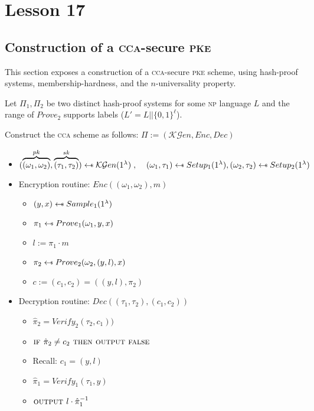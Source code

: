 \chapter*{Lesson 17}

\section{Construction of a \textsc{cca}-secure \textsc{pke}}

This section exposes a construction of a \textsc{cca}-secure \textsc{pke} scheme, using hash-proof systems, membership-hardness, and the $n$-universality property.

Let $\Pi_1, \Pi_2$ be two distinct hash-proof systems for some \textsc{np} language $L$ and the range of $Prove_2$ supports labels ($L'=L||\{0, 1\}^\ell$).

Construct the \textsc{cca} scheme as follows: $\Pi := (\mathcal{KG}en, Enc, Dec)$
\begin{itemize}
    \item $ (\overbrace{(\omega_1,\omega_2)}^{pk}, \overbrace{(\tau_1,\tau_2)}^{sk}) \pickUAR \mathcal{KG}en(1^\lambda)\;,\;\;\;\;(\omega_1, \tau_1) \pickUAR Setup_1(1^\lambda), (\omega_2, \tau_2) \pickUAR Setup_2(1^\lambda)$
    \item Encryption routine: $Enc((\omega_1, \omega_2), m)$
    \begin{itemize}
        \item $ (y, x) \pickUAR Sample_1(1^\lambda)$
        \item $ \pi_1 \pickUAR Prove_1(\omega_1, y, x)$
        \item $ l := \pi_1 \cdot m$
        \item $ \pi_2 \pickUAR Prove_2(\omega_2, (y, l), x)$
        \item $ c := (c_1, c_2) = ((y, l), \pi_2)$
    \end{itemize}
    \item Decryption routine: $Dec((\tau_1, \tau_2), (c_1, c_2))$
    \begin{itemize}
        \item $\hat{\pi}_2 = Verify_2(\tau_2, c_1))$
        \item $\textsc{if } \hat{\pi}_2 \neq c_2 \textsc{ then output false}$
        \item Recall: $c_1 = (y, l)$
        \item $\hat{\pi}_1 = Verify_1(\tau_1, y)$
        \item $\textsc{output } l \cdot \hat{\pi}_1^{-1}$
    \end{itemize}
\end{itemize}

